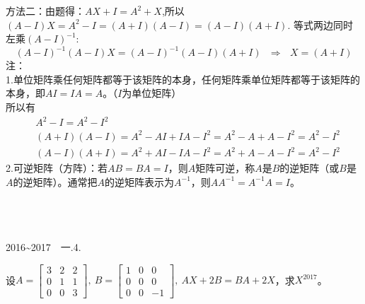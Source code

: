 \documentclass{article}
\begin{document}
\begin{jie}
方法二：由题得：$AX+I=A^{2}+X$,所以$(A-I)X=A^{2}-I=(A+I)(A-I)=(A-I)(A+I)$.
等式两边同时左乘$(A-I)^{-1}$:
\begin{equation*}
 (A-I)^{-1}(A-I)X=(A-I)^{-1}(A-I)(A+I) ~~~\Rightarrow~~~X=(A+I)
\end{equation*}
\textcolor[rgb]{1.00,0.00,0.00}{注：\\
1.单位矩阵乘任何矩阵都等于该矩阵的本身，任何矩阵乘单位矩阵都等于该矩阵的本身，即$AI=IA=A$。（$I$为单位矩阵）\\
所以有
\begin{align*}
&A^ {2}-I=A^{2}-I^{2}\\
&(A+I)(A-I)=A^{2}-AI+IA-I^{2}=A^{2}-A+A-I^{2}=A^{2}-I^{2}\\
&(A-I)(A+I)=A^{2}+AI-IA-I^{2}=A^{2}+A-A-I^{2}=A^{2}-I^{2}
\end{align*}
2.可逆矩阵（方阵）：若$AB=BA=I$，则$A$矩阵可逆，称$A$是$B$的逆矩阵（或$B$是$A$的逆矩阵）。通常把$A$的逆矩阵表示为$A^{-1}$，则$AA^{-1}=A^{-1}A=I$。
}
\end{jie}

{\heiti {} ~}\\
{\heiti {} ~}\\
{\heiti {} ~}\\
2016\~{}2017~~一.4.

设$
A=
\begin{bmatrix}
  3&2&2 \\
  0&1&1\\
  0&0&3
\end{bmatrix}
,~B=
\begin{bmatrix}
  1&0&0 \\
  0&0&0\\
  0&0&-1
\end{bmatrix}
,~AX+2B=BA+2X$，求$X^{2017}$。
\end{document}

